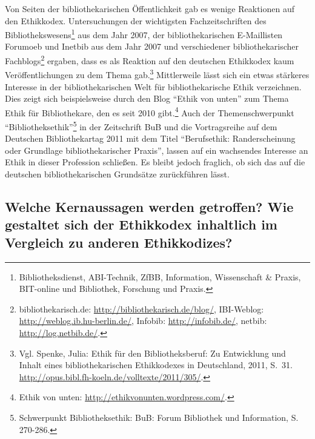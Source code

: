 \documentclass[output=paper]{langscibook}
\begin{document}
Von Seiten der bibliothekarischen Öffentlichkeit gab es wenige
Reaktionen auf den Ethikkodex. Untersuchungen der wichtigsten
Fachzeitschriften des Bibliothekswesens\footnote{Bibliotheksdienst,
  ABI-Technik, ZfBB, Information, Wissenschaft \& Praxis, BIT-online und
  Bibliothek, Forschung und Praxis.} aus dem Jahr 2007, der
bibliothekarischen E-Maillisten Forumoeb und Inetbib aus dem Jahr 2007
und verschiedener bibliothekarischer Fachblogs\footnote{bibliothekarisch.de:
  \url{http://bibliothekarisch.de/blog/}, IBI-Weblog:
  \url{http://weblog.ib.hu-berlin.de/}, Infobib:
  \url{http://infobib.de/}, netbib: \url{http://log.netbib.de/}.}
ergaben, dass es als Reaktion auf den deutschen Ethikkodex kaum
Veröffentlichungen zu dem Thema gab.\footnote{Vgl. Spenke, Julia: Ethik
  für den Bibliotheksberuf: Zu Entwicklung und Inhalt eines
  bibliothekarischen Ethikkodexes in Deutschland, 2011, S.~31.
  \url{http://opus.bibl.fh-koeln.de/volltexte/2011/305/}.} Mittlerweile
lässt sich ein etwas stärkeres Interesse in der bibliothekarischen Welt
für bibliothekarische Ethik verzeichnen. Dies zeigt sich beispielsweise
durch den Blog \enquote{Ethik von unten} zum Thema Ethik für
Bibliothekare, den es seit 2010 gibt.\footnote{Ethik von unten:
  \url{http://ethikvonunten.wordpress.com/}.} Auch der Themenschwerpunkt
\enquote{Bibliotheksethik}\footnote{Schwerpunkt Bibliotheksethik: BuB:
  Forum Bibliothek und Information, S. 270-286.} in der Zeitschrift BuB
und die Vortragsreihe auf dem Deutschen Bibliothekartag 2011 mit dem
Titel \enquote{Berufsethik: Randerscheinung oder Grundlage
bibliothekarischer Praxis}, lassen auf ein wachsendes Interesse an Ethik
in dieser Profession schließen. Es bleibt jedoch fraglich, ob sich das
auf die deutschen bibliothekarischen Grundsätze zurückführen lässt.

\hypertarget{welche-kernaussagen-werden-getroffen-wie-gestaltet-sich-der-ethikkodex-inhaltlich-im-vergleich-zu-anderen-ethikkodizes}{%
\subsection*{Welche Kernaussagen werden getroffen? Wie gestaltet sich der
Ethikkodex inhaltlich im Vergleich zu anderen
Ethikkodizes?}\label{welche-kernaussagen-werden-getroffen-wie-gestaltet-sich-der-ethikkodex-inhaltlich-im-vergleich-zu-anderen-ethikkodizes}}
\end{document}
